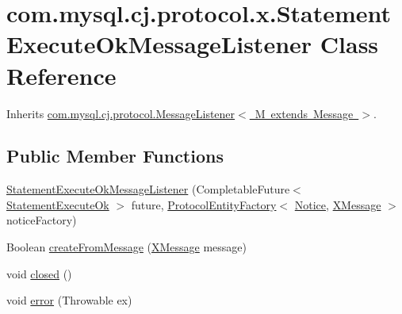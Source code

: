 \hypertarget{classcom_1_1mysql_1_1cj_1_1protocol_1_1x_1_1_statement_execute_ok_message_listener}{}\section{com.\+mysql.\+cj.\+protocol.\+x.\+Statement\+Execute\+Ok\+Message\+Listener Class Reference}
\label{classcom_1_1mysql_1_1cj_1_1protocol_1_1x_1_1_statement_execute_ok_message_listener}


Inherits \mbox{\hyperlink{interfacecom_1_1mysql_1_1cj_1_1protocol_1_1_message_listener}{com.\+mysql.\+cj.\+protocol.\+Message\+Listener$<$ M extends Message $>$}}.

\subsection*{Public Member Functions}
\begin{DoxyCompactItemize}
\item 
\mbox{\hyperlink{classcom_1_1mysql_1_1cj_1_1protocol_1_1x_1_1_statement_execute_ok_message_listener_adde803d9a59bfb47ff7a43941d375655}{Statement\+Execute\+Ok\+Message\+Listener}} (Completable\+Future$<$ \mbox{\hyperlink{classcom_1_1mysql_1_1cj_1_1protocol_1_1x_1_1_statement_execute_ok}{Statement\+Execute\+Ok}} $>$ future, \mbox{\hyperlink{interfacecom_1_1mysql_1_1cj_1_1protocol_1_1_protocol_entity_factory}{Protocol\+Entity\+Factory}}$<$ \mbox{\hyperlink{classcom_1_1mysql_1_1cj_1_1protocol_1_1x_1_1_notice}{Notice}}, \mbox{\hyperlink{classcom_1_1mysql_1_1cj_1_1protocol_1_1x_1_1_x_message}{X\+Message}} $>$ notice\+Factory)
\item 
Boolean \mbox{\hyperlink{classcom_1_1mysql_1_1cj_1_1protocol_1_1x_1_1_statement_execute_ok_message_listener_aea503e89dd40c8375a9bdd26626ff16e}{create\+From\+Message}} (\mbox{\hyperlink{classcom_1_1mysql_1_1cj_1_1protocol_1_1x_1_1_x_message}{X\+Message}} message)
\item 
void \mbox{\hyperlink{classcom_1_1mysql_1_1cj_1_1protocol_1_1x_1_1_statement_execute_ok_message_listener_a9451a156729766ae954e065537f03178}{closed}} ()
\item 
void \mbox{\hyperlink{classcom_1_1mysql_1_1cj_1_1protocol_1_1x_1_1_statement_execute_ok_message_listener_abce681bc363086c23732d92c3fb8bce9}{error}} (Throwable ex)
\end{DoxyCompactItemize}


